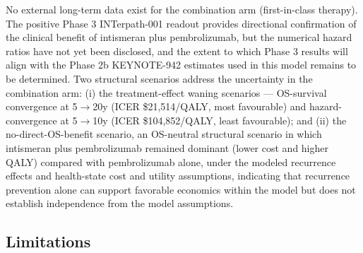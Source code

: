 \documentclass[12pt,a4paper]{article}
\begin{document}
No external long-term data exist for the combination arm (first-in-class therapy). The positive Phase 3 \mbox{INTerpath-001} readout provides directional confirmation of the clinical benefit of intismeran plus \mbox{pembrolizumab}, but the numerical hazard ratios have not yet been disclosed, and the extent to which Phase 3 results will align with the Phase 2b \mbox{KEYNOTE-942} estimates used in this model remains to be determined. Two structural scenarios address the uncertainty in the combination arm: (i) the treatment-effect waning scenarios --- OS-survival convergence at 5$\to$20y (ICER \$21,514/QALY, most favourable) and hazard-convergence at 5$\to$10y (ICER \$104,852/QALY, least favourable); and (ii) the no-direct-OS-benefit scenario, an OS-neutral structural scenario in which intismeran plus \mbox{pembrolizumab} remained dominant (lower cost and higher QALY) compared with \mbox{pembrolizumab} alone, under the modeled recurrence effects and health-state cost and utility assumptions, indicating that recurrence prevention alone can support favorable economics within the model but does not establish independence from the model assumptions.

\subsection{Limitations}
\end{document}
